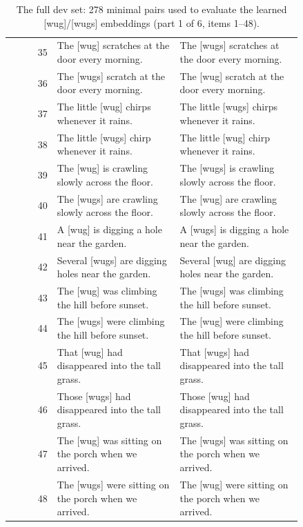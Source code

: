 \begin{table}[p]
\begin{tabular}{@{}rp{0.42\linewidth}p{0.42\linewidth}@{}}
35 & The {[}wug{]} scratches at the door every morning. & The {[}wugs{]} scratches at the door every morning. \\
36 & The {[}wugs{]} scratch at the door every morning. & The {[}wug{]} scratch at the door every morning. \\
37 & The little {[}wug{]} chirps whenever it rains. & The little {[}wugs{]} chirps whenever it rains. \\
38 & The little {[}wugs{]} chirp whenever it rains. & The little {[}wug{]} chirp whenever it rains. \\
39 & The {[}wug{]} is crawling slowly across the floor. & The {[}wugs{]} is crawling slowly across the floor. \\
40 & The {[}wugs{]} are crawling slowly across the floor. & The {[}wug{]} are crawling slowly across the floor. \\
41 & A {[}wug{]} is digging a hole near the garden. & A {[}wugs{]} is digging a hole near the garden. \\
42 & Several {[}wugs{]} are digging holes near the garden. & Several {[}wug{]} are digging holes near the garden. \\
43 & The {[}wug{]} was climbing the hill before sunset. & The {[}wugs{]} was climbing the hill before sunset. \\
44 & The {[}wugs{]} were climbing the hill before sunset. & The {[}wug{]} were climbing the hill before sunset. \\
45 & That {[}wug{]} had disappeared into the tall grass. & That {[}wugs{]} had disappeared into the tall grass. \\
46 & Those {[}wugs{]} had disappeared into the tall grass. & Those {[}wug{]} had disappeared into the tall grass. \\
47 & The {[}wug{]} was sitting on the porch when we arrived. & The {[}wugs{]} was sitting on the porch when we arrived. \\
48 & The {[}wugs{]} were sitting on the porch when we arrived. & The {[}wug{]} were sitting on the porch when we arrived. \\
\hline
\end{tabular}
\caption{The full dev set: 278 minimal pairs used to evaluate the learned {[}wug{]}/{[}wugs{]} embeddings (part 1 of 6, items 1--48).}
\label{tab:dev-set-1}
\end{table}

